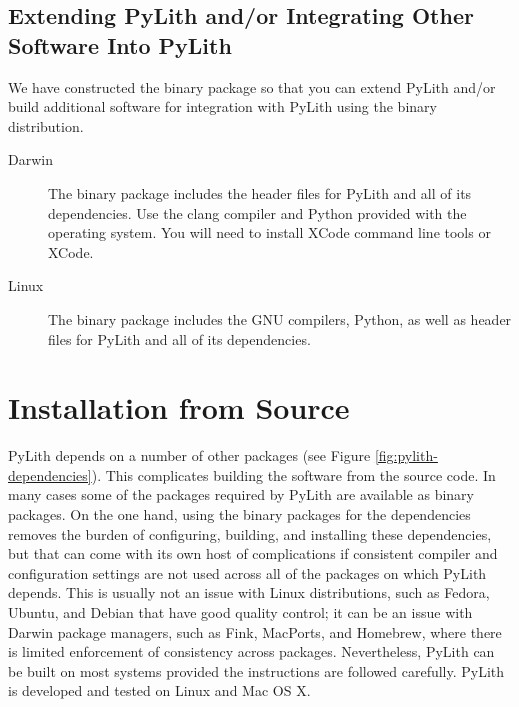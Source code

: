 \subsection{Extending PyLith and/or Integrating Other Software Into PyLith}

We have constructed the binary package so that you can extend PyLith
and/or build additional software for integration with PyLith using the
binary distribution.

\begin{description}
\item[Darwin] The binary package includes the header files for PyLith
  and all of its dependencies. Use the clang compiler and Python
  provided with the operating system. You will need to install XCode
  command line tools or XCode.
\item[Linux] The binary package includes the GNU compilers, Python, as
  well as header files for PyLith and all of its dependencies.
\end{description}


\section{Installation from Source}

PyLith depends on a number of other packages (see Figure
\vref{fig:pylith-dependencies}).  This complicates building the
software from the source code. In many cases some of the packages
required by PyLith are available as binary packages. On the one hand,
using the binary packages for the dependencies removes the burden of
configuring, building, and installing these dependencies, but that can
come with its own host of complications if consistent compiler and
configuration settings are not used across all of the packages on
which PyLith depends. This is usually not an issue with Linux
distributions, such as Fedora, Ubuntu, and Debian that have good
quality control; it can be an issue with Darwin package managers, such
as Fink, MacPorts, and Homebrew, where there is limited enforcement of
consistency across packages. Nevertheless, PyLith can be built on most
systems provided the instructions are followed carefully. PyLith is
developed and tested on Linux and Mac OS X.

